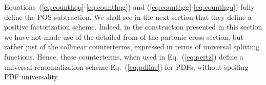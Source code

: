 Equations~(\ref{eq:counthqq}-\ref{eq:counthqg}) and (\ref{eq:counthgg}-\ref{eq:counthgq}) 
fully define the POS subtraction. We shall see in the next section
that they define a positive factorization scheme. Indeed, in the
construction presented in this section we have not made use of the
detailed from of the partonic cross section, but rather just of the
collinear counterterms, expressed in terms of universal splitting
functions. Hence, these counterterms, when used in
Eq.~(\ref{eq:pertz})  define a universal renormalization scheme
Eq.~(\ref{eq:pdffac}) for PDFs, without spoiling PDF universality.

